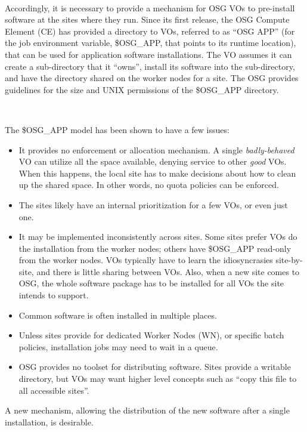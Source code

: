 \documentclass[a4paper]{jpconf}
\begin{document}
~

Accordingly, it is necessary to provide a mechanism for OSG VOs to pre-install software at the sites where they run.
Since its first release, the OSG Compute Element (CE) has provided a directory to VOs, referred to as ``OSG APP'' 
(for the job environment variable, \$OSG\_APP, that points to its runtime location), 
that can be used for application software installations.  
The VO assumes it can create a sub-directory that it “owns”, 
install its software into the sub-directory, and have the directory shared on the worker nodes for a site. 
The OSG provides guidelines for the size and UNIX permissions of the \$OSG\_APP directory.

~

The \$OSG\_APP model has been shown to have a few issues:

\begin{itemize} 
\item It provides no enforcement or allocation mechanism.  
      A single \textit{badly-behaved} VO can utilize all the space available, 
      denying service to other \textit{good} VOs.  
      When this happens, the local site has to make decisions about how to clean up the shared space.
      In other words, no quota policies can be enforced.
\item The sites likely have an internal prioritization for a few VOs, or even just one. 
\item It may be implemented inconsistently across sites.  
      Some sites prefer VOs do the installation from the worker nodes; 
      others have \$OSG\_APP read-only from the worker nodes.  
      VOs typically have to learn the idiosyncrasies site-by-site, and there is little sharing between VOs.
      Also, when a new site comes to OSG, the whole software package has to be installed for all VOs the site intends to support.
\item Common software is often installed in multiple places.
\item Unless sites provide for dedicated Worker Nodes (WN), or specific batch policies,
      installation jobs may need to wait in a queue.
\item OSG provides no toolset for distributing software.  
      Sites provide a writable directory, 
      but VOs may want higher level concepts such as ``copy this file to all accessible sites''.
\end{itemize} 

A new mechanism, allowing the distribution of the new software after a single
installation, is desirable.
\end{document}
